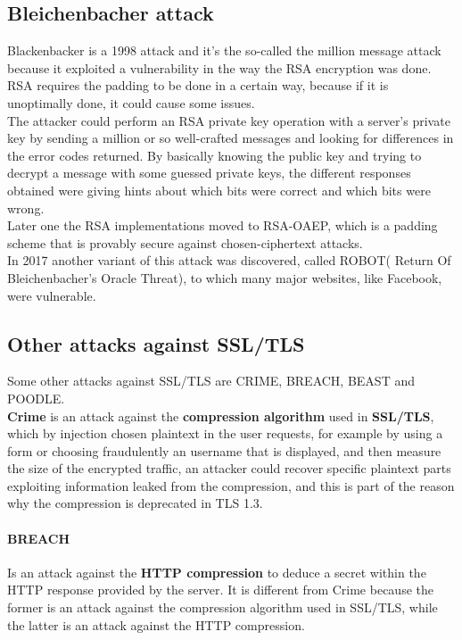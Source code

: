 \subsection{Bleichenbacher attack}
Blackenbacker is a 1998 attack and it's the so-called the million
message attack because it exploited a vulnerability in the way the RSA
encryption was done. RSA requires the padding to be done in a certain
way, because if it is unoptimally done, it could cause some issues.\\
The attacker could perform an RSA private key operation with a
server’s private key by sending a million or so well-crafted messages
and looking for differences in the error codes returned. By basically
knowing the public key and trying to decrypt a message with some
guessed private keys, the different responses obtained were giving
hints about which bits were correct and which bits were wrong.\\
Later one the RSA implementations moved to RSA-OAEP, which is a
padding scheme that is provably secure against chosen-ciphertext
attacks.\\
In 2017 another variant of this attack was discovered, called
ROBOT( Return Of Bleichenbacher's Oracle Threat), to which many major
websites, like Facebook, were vulnerable.

\subsection{Other attacks against SSL/TLS}
Some other attacks against SSL/TLS are CRIME, BREACH, BEAST and
POODLE.\\
\textbf{Crime} is an attack against the \textbf{compression algorithm}
used in \textbf{SSL/TLS}, which by injection chosen plaintext in the
user requests, for example by using a form or choosing fraudulently an
username that is displayed, and then measure the size of the encrypted
traffic, an attacker could recover specific plaintext parts exploiting
information leaked from the compression, and this is part of the
reason why the compression is deprecated in TLS 1.3.
\paragraph{BREACH} 
Is an attack against the \textbf{HTTP compression} to deduce a secret
within the HTTP response provided by the server. It is different from
Crime because the former is an attack against the compression
algorithm used in SSL/TLS, while the latter is an attack against the
HTTP compression.
